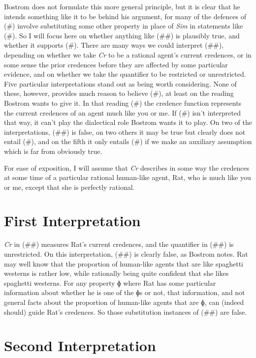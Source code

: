 \documentclass[
  11pt,
  letterpaper,
  DIV=11,
  numbers=noendperiod,
  twoside]{scrartcl}
\begin{document}
Bostrom does not formulate this more general principle, but it is clear
that he intends something like it to be behind his argument, for many of
the defences of (\#) involve substituting some other property in place
of \emph{Sim} in statements like (\#). So I will focus here on whether
anything like (\#\#) is plausibly true, and whether it supports (\#).
There are many ways we could interpret (\#\#), depending on whether we
take \emph{Cr} to be a rational agent's current credences, or in some
sense the prior credences before they are affected by some particular
evidence, and on whether we take the quantifier to be restricted or
unrestricted. Five particular interpretations stand out as being worth
considering. None of these, however, provides much reason to believe
(\#), at least on the reading Bostrom wants to give it. In that reading
(\#) the credence function represents the current credences of an agent
much like you or me. If (\#) isn't interpreted that way, it can't play
the dialectical role Bostrom wants it to play. On two of the
interpretations, (\#\#) is false, on two others it may be true but
clearly does not entail (\#), and on the fifth it only entails (\#) if
we make an auxiliary assumption which is far from obviously true.

For ease of exposition, I will assume that \emph{Cr} describes in some
way the credences at some time of a particular rational human-like
agent, Rat, who is much like you or me, except that she is perfectly
rational.

\section{First Interpretation}\label{first-interpretation}

\emph{Cr} in (\#\#) measures Rat's current credences, and the quantifier
in (\#\#) is unrestricted. On this interpretation, (\#\#) is clearly
false, as Bostrom notes. Rat may well know that the proportion of
human-like agents that are like spaghetti westerns is rather low, while
rationally being quite confident that she likes spaghetti westerns. For
any property ɸ where Rat has some particular information about whether
he is one of the ɸs or not, that information, and not general facts
about the proportion of human-like agents that are ɸ, can (indeed
should) guide Rat's credences. So those substitution instances of (\#\#)
are false.

\section{Second Interpretation}\label{second-interpretation}
\end{document}
